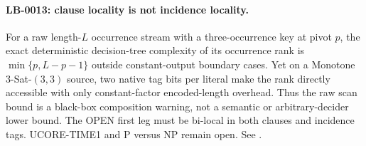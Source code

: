 \paragraph{LB-0013: clause locality is not incidence locality.}
For a raw length-$L$ occurrence stream with a three-occurrence key at pivot
$p$, the exact deterministic decision-tree complexity of its occurrence
rank is $\min\{p,L-p-1\}$ outside constant-output boundary cases.  Yet on a
Monotone 3-Sat-$(3,3)$ source, two native tag bits per literal make the rank
directly accessible with only constant-factor encoded-length overhead.
Thus the raw scan bound is a black-box composition warning, not a semantic
or arbitrary-decider lower bound.  The OPEN first leg must be bi-local in
both clauses and incidence tags.  UCORE-TIME1 and P versus NP remain open.
See .
